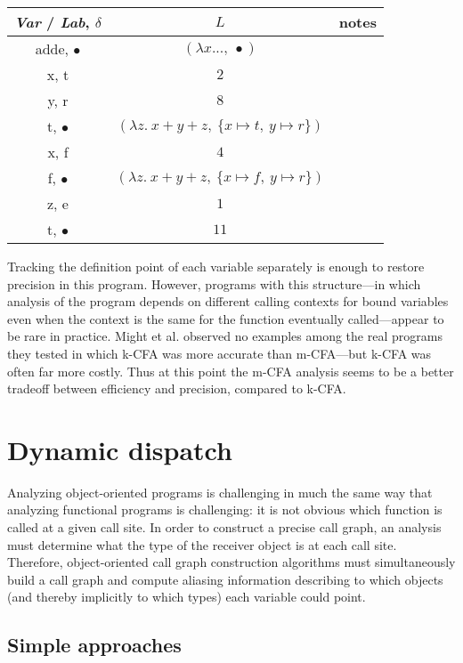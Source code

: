 \documentclass[11pt]{article}
\def\tablespace{\vspace{2ex}}
\begin{document}
\tablespace
\begin{tabular}{c | c | l}

\textit{Var} / \textit{Lab}, $\delta$ & $L$ & notes \\
\hline
adde, $\bullet$ & $(\lambda x...,~ \bullet)$ \\
x, t            & $2$ \\
y, r            & $8$ \\
t, $\bullet$    & $(\lambda z .~ x + y + z,~\{x \mapsto t,~ y \mapsto r\})$ \\
x, f            & $4$ \\
f, $\bullet$    & $(\lambda z .~ x + y + z,~\{x \mapsto f,~ y \mapsto r\})$ \\
z, e            & $1$ \\
t, $\bullet$    & $11$ \\

\end{tabular}
\tablespace

Tracking the definition point of each variable separately is enough to restore precision in this program.  However, programs with this structure---in which analysis of the program depends on different calling contexts for bound variables even when the context is the same for the function eventually called---appear to be rare in practice.  Might et al. observed no examples among the real programs they tested in which k-CFA was more accurate than m-CFA---but k-CFA was often far more costly.  Thus at this point the m-CFA analysis seems to be a better tradeoff between efficiency and precision, compared to k-CFA.


\section{Dynamic dispatch}

Analyzing object-oriented programs is challenging in much the same way that analyzing functional programs is challenging: it is not obvious which function is called at a given call site.  In order to construct a precise call graph, an analysis must determine what the type of the receiver object is at each call site.  Therefore, object-oriented call graph construction algorithms must simultaneously build a call graph and compute aliasing information describing to which objects (and thereby implicitly to which types) each variable could point.

\subsection{Simple approaches}
\end{document}
